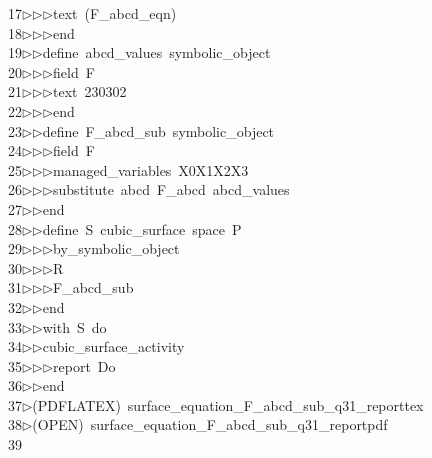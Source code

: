 \begin{tabbing}
17\>$\triangleright$\>$\triangleright$\>$\triangleright$\>text\ (F\_abcd\_eqn)\ \\[0pt]
18\>$\triangleright$\>$\triangleright$\>$\triangleright$\>end\ \\[0pt]
19\>$\triangleright$\>$\triangleright$\>define\ abcd\_values\ symbolic\_object\ \\[0pt]
20\>$\triangleright$\>$\triangleright$\>$\triangleright$\>field\ F\ \\[0pt]
21\>$\triangleright$\>$\triangleright$\>$\triangleright$\>text\ 230302\ \\[0pt]
22\>$\triangleright$\>$\triangleright$\>$\triangleright$\>end\ \\[0pt]
23\>$\triangleright$\>$\triangleright$\>define\ F\_abcd\_sub\ symbolic\_object\ \\[0pt]
24\>$\triangleright$\>$\triangleright$\>$\triangleright$\>field\ F\ \\[0pt]
25\>$\triangleright$\>$\triangleright$\>$\triangleright$\>managed\_variables\ X0X1X2X3\ \\[0pt]
26\>$\triangleright$\>$\triangleright$\>$\triangleright$\>substitute\ abcd\ F\_abcd\ abcd\_values\ \\[0pt]
27\>$\triangleright$\>$\triangleright$\>end\ \\[0pt]
28\>$\triangleright$\>$\triangleright$\>define\ S\ cubic\_surface\ space\ P\ \\[0pt]
29\>$\triangleright$\>$\triangleright$\>$\triangleright$\>by\_symbolic\_object\ \\[0pt]
30\>$\triangleright$\>$\triangleright$\>$\triangleright$\>R\ \\[0pt]
31\>$\triangleright$\>$\triangleright$\>$\triangleright$\>F\_abcd\_sub\ \\[0pt]
32\>$\triangleright$\>$\triangleright$\>end\ \\[0pt]
33\>$\triangleright$\>$\triangleright$\>with\ S\ do\ \\[0pt]
34\>$\triangleright$\>$\triangleright$\>cubic\_surface\_activity\ \\[0pt]
35\>$\triangleright$\>$\triangleright$\>$\triangleright$\>report\ Do\ \\[0pt]
36\>$\triangleright$\>$\triangleright$\>end\\[0pt]
37\>$\triangleright$\>(PDFLATEX)\ surface\_equation\_F\_abcd\_sub\_q31\_reporttex\\[0pt]
38\>$\triangleright$\>(OPEN)\ surface\_equation\_F\_abcd\_sub\_q31\_reportpdf\\[0pt]
39\>\end{tabbing}
